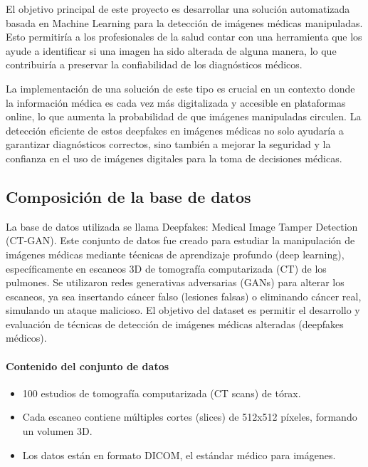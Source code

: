 \documentclass[conference]{IEEEtran}
\begin{document}
El objetivo principal de este proyecto es desarrollar una solución automatizada basada en Machine Learning para la detección de imágenes médicas manipuladas. Esto permitiría a los profesionales de la salud contar con una herramienta que los ayude a identificar si una imagen ha sido alterada de alguna manera, lo que contribuiría a preservar la confiabilidad de los diagnósticos médicos.

La implementación de una solución de este tipo es crucial en un contexto donde la información médica es cada vez más digitalizada y accesible en plataformas online, lo que aumenta la probabilidad de que imágenes manipuladas circulen. La detección eficiente de estos deepfakes en imágenes médicas no solo ayudaría a garantizar diagnósticos correctos, sino también a mejorar la seguridad y la confianza en el uso de imágenes digitales para la toma de decisiones médicas.

\subsection{Composición de la base de datos}

La base de datos utilizada se llama Deepfakes: Medical Image Tamper Detection (CT-GAN). Este conjunto de datos fue creado para estudiar la manipulación de imágenes médicas mediante técnicas de aprendizaje profundo (deep learning), específicamente en escaneos 3D de tomografía computarizada (CT) de los pulmones\cite{uci2020deepfakes}.
Se utilizaron redes generativas adversarias (GANs) para alterar los escaneos, ya sea insertando cáncer falso (lesiones falsas) o eliminando cáncer real, simulando un ataque malicioso. El objetivo del dataset es permitir el desarrollo y evaluación de técnicas de detección de imágenes médicas alteradas (deepfakes médicos).

\paragraph{Contenido del conjunto de datos}

\begin{itemize}
    \item 100 estudios de tomografía computarizada (CT scans) de tórax.
    \item Cada escaneo contiene múltiples cortes (slices) de 512x512 píxeles, formando un volumen 3D.
    \item Los datos están en formato DICOM, el estándar médico para imágenes.
\end{itemize}
\end{document}
